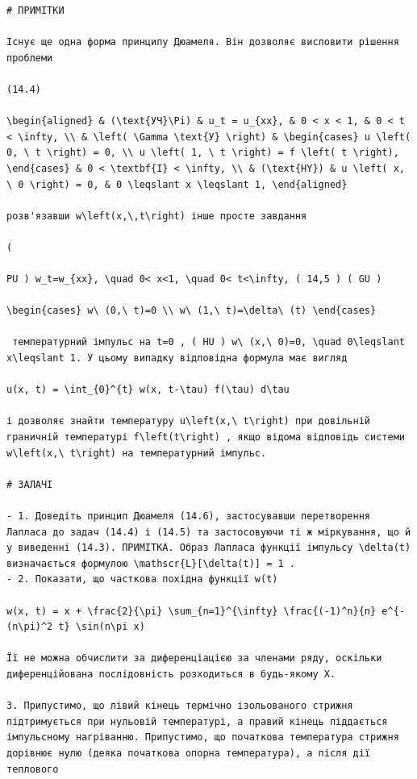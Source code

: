 \documentclass[
  ukrainian,
]{article}
\begin{document}
\begin{verbatim}
# ПРИМІТКИ

Існує ще одна форма принципу Дюамеля. Він дозволяє висловити рішення проблеми

(14.4)

\begin{aligned} & (\text{УЧ}\Pi) & u_t = u_{xx}, & 0 < x < 1, & 0 < t < \infty, \\ & \left( \Gamma \text{У} \right) & \begin{cases} u \left( 0, \ t \right) = 0, \\ u \left( 1, \ t \right) = f \left( t \right), \end{cases} & 0 < \textbf{I} < \infty, \\ & (\text{HY}) & u \left( x, \ 0 \right) = 0, & 0 \leqslant x \leqslant 1, \end{aligned}

розв'язавши w\left(x,\,t\right) інше просте завдання

(

PU ) w_t=w_{xx}, \quad 0< x<1, \quad 0< t<\infty, ( 14,5 ) ( GU ) 

\begin{cases} w\ (0,\ t)=0 \\ w\ (1,\ t)=\delta\ (t) \end{cases}

 температурний імпульс на t=0 , ( HU ) w\ (x,\ 0)=0, \quad 0\leqslant x\leqslant 1. У цьому випадку відповідна формула має вигляд

u(x, t) = \int_{0}^{t} w(x, t-\tau) f(\tau) d\tau

і дозволяє знайти температуру u\left(x,\ t\right) при довільній граничній температурі f\left(t\right) , якщо відома відповідь системи w\left(x,\ t\right) на температурний імпульс.

# ЗАЛАЧІ

- 1. Доведіть принцип Дюамеля (14.6), застосувавши перетворення Лапласа до задач (14.4) і (14.5) та застосовуючи ті ж міркування, що й у виведенні (14.3). ПРИМІТКА. Образ Лапласа функції імпульсу \delta(t) визначається формулою \mathscr{L}[\delta(t)] = 1 .
- 2. Показати, що часткова похідна функції w(t)

w(x, t) = x + \frac{2}{\pi} \sum_{n=1}^{\infty} \frac{(-1)^n}{n} e^{-(n\pi)^2 t} \sin(n\pi x)

Її не можна обчислити за диференціацією за членами ряду, оскільки диференційована послідовність розходиться в будь-якому X.

3. Припустимо, що лівий кінець термічно ізольованого стрижня підтримується при нульовій температурі, а правий кінець піддається імпульсному нагріванню. Припустимо, що початкова температура стрижня дорівнює нулю (деяка початкова опорна температура), а після дії теплового


\end{verbatim}
\end{document}
